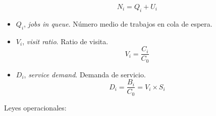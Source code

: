 \documentclass[12pt,spanish]{article}
\begin{document}
\begin{itemize}
		\begin{equation*}
			N_i = Q_i + U_i
		\end{equation*}
	\item $Q_i$, \textit{jobs in queue}. Número medio de trabajos en cola de espera.
	\item $V_i$, \textit{visit ratio}. Ratio de visita.
		\begin{equation*}
			V_i = \frac{C_i}{C_0}
		\end{equation*}
	\item $D_i$, \textit{service demand}. Demanda de servicio.
		\begin{equation*}
			D_i = \frac{B_i}{C_0} = V_i \times S_i
		\end{equation*}
\end{itemize}

Leyes operacionales:
\end{document}
